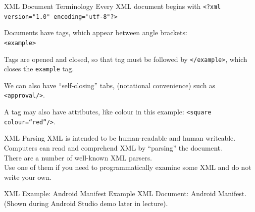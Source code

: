 \documentclass[aspectratio=169]{beamer}
\begin{document}
\begin{frame}[fragile]{XML Document Terminology}
Every XML document begins with \verb+<?xml version="1.0" encoding="utf-8"?>+

Documents have \alert{tags}, which appear between angle brackets:\\
\quad \texttt{<example>}

Tags are opened and closed, so that tag must be followed by \texttt{</example>}, which closes the \texttt{example} tag. 

We can also have ``self-closing'' tabs, (notational convenience) such as \texttt{<approval/>}.

A tag may also have attributes, like colour in this example: \texttt{<square colour=``red''/>}.
\end{frame}



\begin{frame}{XML Parsing}
XML is intended to be human-readable and human writeable. \\
\vspace{1em}
Computers can read and comprehend XML by ``parsing'' the document. \\
\vspace{1em}
There are a number of well-known XML parsers. \\
\vspace{1em}
Use one of them if you need to programmatically examine some XML and do not write your own.
\end{frame}



\begin{frame}[fragile]{XML Example: Android Manifest}
Example XML Document: Android Manifest. \\
\vspace{2em}
(Shown during Android Studio demo later in lecture).
\end{frame}
\end{document}
